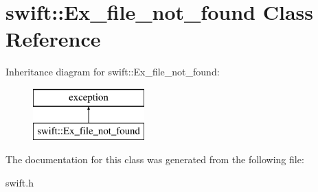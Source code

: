 \hypertarget{classswift_1_1_ex__file__not__found}{\section{swift\-:\-:Ex\-\_\-file\-\_\-not\-\_\-found Class Reference}
\label{classswift_1_1_ex__file__not__found}
}
Inheritance diagram for swift\-:\-:Ex\-\_\-file\-\_\-not\-\_\-found\-:\begin{figure}[H]
\begin{center}
\leavevmode
\includegraphics[height=2.000000cm]{classswift_1_1_ex__file__not__found}
\end{center}
\end{figure}


The documentation for this class was generated from the following file\-:\begin{DoxyCompactItemize}
\item 
swift.\-h\end{DoxyCompactItemize}
